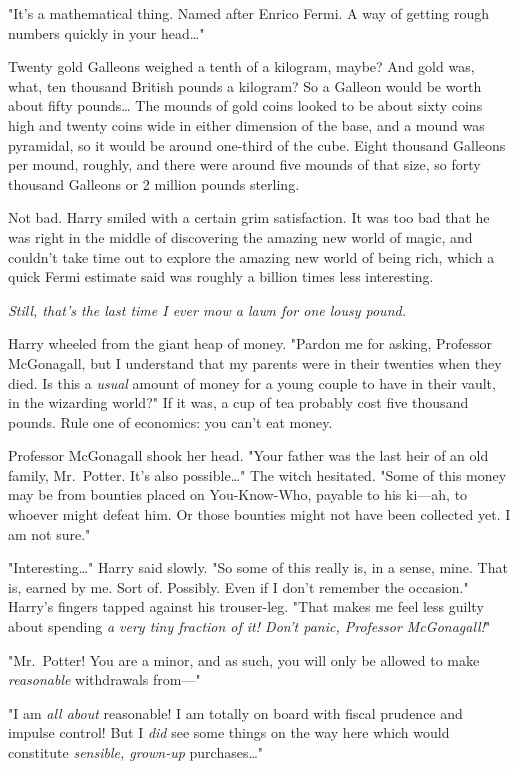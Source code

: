 "It's a mathematical thing. Named after Enrico Fermi. A way of getting rough
numbers quickly in your head{\ldots}"

Twenty gold Galleons weighed a tenth of a kilogram, maybe? And gold was, what,
ten thousand British pounds a kilogram? So a Galleon would be worth about fifty
pounds{\ldots} The mounds of gold coins looked to be about sixty coins high and
twenty coins wide in either dimension of the base, and a mound was pyramidal,
so it would be around one-third of the cube. Eight thousand Galleons per mound,
roughly, and there were around five mounds of that size, so forty thousand
Galleons or 2 million pounds sterling.

Not bad. Harry smiled with a certain grim satisfaction. It was too bad that he
was right in the middle of discovering the amazing new world of magic, and
couldn't take time out to explore the amazing new world of being rich, which a
quick Fermi estimate said was roughly a billion times less interesting.

\emph{Still, that's the last time I ever mow a lawn for one lousy pound.}

Harry wheeled from the giant heap of money. "Pardon me for asking, Professor
McGonagall, but I understand that my parents were in their twenties when they
died. Is this a \emph{usual} amount of money for a young couple to have in
their vault, in the wizarding world?" If it was, a cup of tea probably cost
five thousand pounds. Rule one of economics: you can't eat money.

Professor McGonagall shook her head. "Your father was the last heir of an old
family, Mr.~Potter. It's also possible{\ldots}" The witch hesitated. "Some of
this money may be from bounties placed on You-Know-Who, payable to his ki---ah,
to whoever might defeat him. Or those bounties might not have been collected
yet. I am not sure."

"Interesting{\ldots}" Harry said slowly. "So some of this really is, in a
sense, mine. That is, earned by me. Sort of. Possibly. Even if I don't remember
the occasion." Harry's fingers tapped against his trouser-leg. "That makes me
feel less guilty about spending \emph{a very tiny fraction of it! Don't panic,
Professor McGonagall!}"

"Mr.~Potter! You are a minor, and as such, you will only be allowed to make
\emph{reasonable} withdrawals from---"

"I am \emph{all about} reasonable! I am totally on board with fiscal prudence
and impulse control! But I \emph{did} see some things on the way here which
would constitute \emph{sensible, grown-up} purchases{\ldots}"

